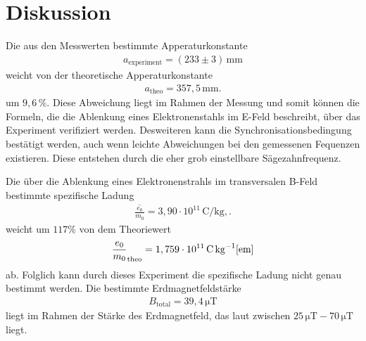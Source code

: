 \newpage
\section{Diskussion}
Die aus den Messwerten bestimmte Apperaturkonstante
\begin{align*}
a_\mathrm{experiment}=(233\pm3)\,\si{\milli\meter}
\end{align*}
weicht von der theoretische Apperaturkonstante
\begin{align*}
  a_\mathrm{theo}=357,5\,\si{\milli\meter}.
\end{align*}
um $9,6\,\si{\percent}$. Diese Abweichung
liegt im Rahmen der Messung
und somit können die Formeln, die die
Ablenkung eines Elektronenstahls im
E-Feld beschreibt, über das Experiment
verifiziert werden.
Desweiteren kann
die Synchronisationsbedingung
bestätigt werden, auch wenn
leichte Abweichungen bei den
gemessenen Fequenzen existieren.
Diese entstehen durch die eher
grob einstellbare Sägezahnfrequenz.

Die über die Ablenkung
eines Elektronenstrahls im transversalen
B-Feld bestimmte spezifische Ladung
\begin{align*}
\overline{\frac{e_0}{m_0}}=3,90\cdot 10^{11}\,\si{\coulomb\per\kilo\gram},.
\end{align*}
weicht um $117\si{\percent} $
von dem Theoriewert
\begin{align*}
\frac{e_0}{m_0}_\mathrm{theo}=1,759\cdot 10^{11}\,\si{\coulomb\per\kilo\gram} \text{\cite{em}}
\end{align*}
ab. Folglich kann durch dieses Experiment
die spezifische Ladung nicht genau bestimmt werden.
Die bestimmte Erdmagnetfeldstärke
\begin{align*}
  B_\mathrm{total}=39,4\,\si{\micro\tesla}
\end{align*}
liegt im Rahmen der Stärke des
Erdmagnetfeld, das laut \cite{erde}
zwischen $25\,\si{\micro\tesla}-70\,\si{\micro\tesla}$
liegt.
